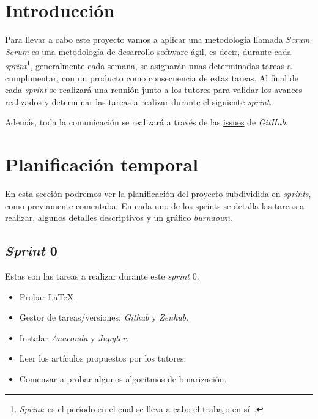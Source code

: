 
\section{Introducción}
Para llevar a cabo este proyecto vamos a aplicar una metodología llamada \textit{Scrum}. \textit{Scrum} es una metodología de desarrollo software ágil, es decir, durante cada \textit{sprint}\footnote{\textit{Sprint}: es el período en el cual se lleva a cabo el trabajo en sí~\cite{wiki:scrum}.}, generalmente cada semana, se asignarán unas determinadas tareas a cumplimentar, con un producto como consecuencia de estas tareas. Al final de cada \textit{sprint} se realizará una reunión junto a los tutores para validar los avances realizados y determinar las tareas a realizar durante el siguiente \textit{sprint}.

Además, toda la comunicación se realizará a través de las \href{https://github.com/jasag/Phytoliths-recognition-system}{issues} de \textit{GitHub}.

\section{Planificación temporal}

En esta sección podremos ver la planificación del proyecto subdividida en \textit{sprints}, como previamente comentaba. En cada uno de los sprints se detalla las tareas a realizar, algunos detalles descriptivos y un gráfico \textit{burndown}.


\subsection{\textit{Sprint} 0}
Estas son las tareas a realizar durante este \textit{sprint} 0:

\begin{itemize}
	\item Probar \LaTeX.
	\item Gestor de tareas/versiones: \textit{Github} y \textit{Zenhub}.
	\item Instalar \textit{Anaconda} y \textit{Jupyter}.
	\item Leer los artículos propuestos por los tutores.
	\item Comenzar a probar algunos algoritmos de binarización.
\end{itemize}

